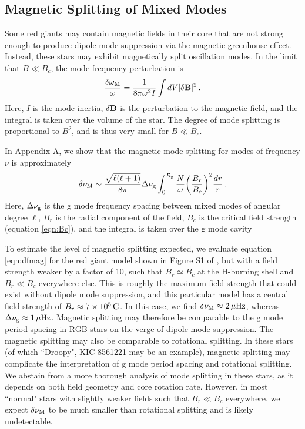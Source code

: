 \subsection{Magnetic Splitting of Mixed Modes}

Some red giants may contain magnetic fields in their core that are not strong enough to produce dipole mode suppression via the magnetic greenhouse effect. Instead, these stars may exhibit magnetically split oscillation modes. In the limit that $B \ll B_c$, the mode frequency perturbation is \citep{Unno_1989}
\begin{equation}
\label{eqn:dommag}
\frac{\delta \omega_{\rm M}}{\omega} = \frac{1}{8 \pi \omega^2 I} \int d V | \delta {\bf B} |^2 \, .
\end{equation}
Here, $I$ is the mode inertia,  $\delta {\bf B}$ is the perturbation to the magnetic field, and the integral is taken over the volume of the star. The degree of mode splitting is proportional to $B^2$, and is thus very small for $B \ll B_c$.

In Appendix A, we show that the magnetic mode splitting for modes of frequency $\nu$ is approximately
\begin{equation}
\label{eqn:dfmag}
\delta \nu_{\rm M} \sim \frac{\sqrt{\ell(\ell+1)}}{8 \pi} \Delta \nu_{\rm g} \int^{R_{\rm g}}_0 \frac{N}{\omega} \bigg(\frac{B_r}{B_c}\bigg)^2 \frac{dr}{r} \, .
\end{equation}
Here, $\Delta \nu_{\rm g}$ is the g mode frequency spacing between mixed modes of angular degree $\ell$, $B_r$ is the radial component of the field, $B_c$ is the critical field strength (equation \ref{eqn:Bc}), and the integral is taken over the g mode cavity

To estimate the level of magnetic splitting expected, we evaluate equation \ref{eqn:dfmag} for the red giant model shown in Figure S1 of \cite{Fuller_2015}, but with a field strength weaker by a factor of 10, such that $B_r \simeq B_c$ at the H-burning shell and $B_r \ll B_c$ everywhere else. This is roughly the maximum field strength that could exist without dipole mode suppression, and this particular model has a central field strength of $B_r \approx 7 \times 10^5 \, {\rm G}$.  In this case, we find $\delta \nu_{\rm M} \approx 2 \, \mu {\rm Hz}$, whereas $\Delta \nu_{\rm g} \approx 1 \, \mu{\rm Hz}$. Magnetic splitting may therefore be comparable to the g mode period spacing in RGB stars on the verge of dipole mode suppression. The magnetic splitting may also be comparable to rotational splitting. In these stars (of which ``Droopy", KIC 8561221 \cite{Garcia_2014} may be an example), magnetic splitting may complicate the interpretation of g mode period spacing and rotational splitting. We abstain from a more thorough analysis of mode splitting in these stars, as it depends on both field geometry and core rotation rate. However, in most ``normal" stars with slightly weaker fields such that $B_r \ll B_c$ everywhere, we expect $\delta \nu_{\rm M}$ to be much smaller than rotational splitting and is likely undetectable. 




